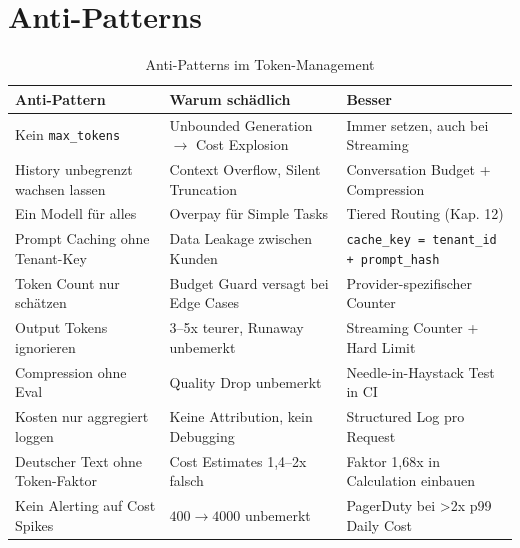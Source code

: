 
\section{Anti-Patterns}
\label{sec:antipatterns}

\begin{table}[H]
\centering
\begin{tabular}{@{}p{3.5cm}p{5.5cm}p{5.5cm}@{}}
\toprule
\textbf{Anti-Pattern} & \textbf{Warum schädlich} & \textbf{Besser} \\
\midrule
Kein \texttt{max\_tokens} & Unbounded Generation $\to$ Cost Explosion & Immer setzen, auch bei Streaming \\
History unbegrenzt wachsen lassen & Context Overflow, Silent Truncation & Conversation Budget + Compression \\
Ein Modell für alles & Overpay für Simple Tasks & Tiered Routing (Kap. 12) \\
Prompt Caching ohne Tenant-Key & Data Leakage zwischen Kunden & \texttt{cache\_key = tenant\_id + prompt\_hash} \\
Token Count nur schätzen & Budget Guard versagt bei Edge Cases & Provider-spezifischer Counter \\
Output Tokens ignorieren & 3--5x teurer, Runaway unbemerkt & Streaming Counter + Hard Limit \\
Compression ohne Eval & Quality Drop unbemerkt & Needle-in-Haystack Test in CI \\
Kosten nur aggregiert loggen & Keine Attribution, kein Debugging & Structured Log pro Request \\
Deutscher Text ohne Token-Faktor & Cost Estimates 1,4--2x falsch & Faktor 1,68x in Calculation einbauen \\
Kein Alerting auf Cost Spikes & $400 \to 4000$ unbemerkt & PagerDuty bei >2x p99 Daily Cost \\
\bottomrule
\end{tabular}
\caption{Anti-Patterns im Token-Management}
\label{tab:antipatterns}
\end{table}

